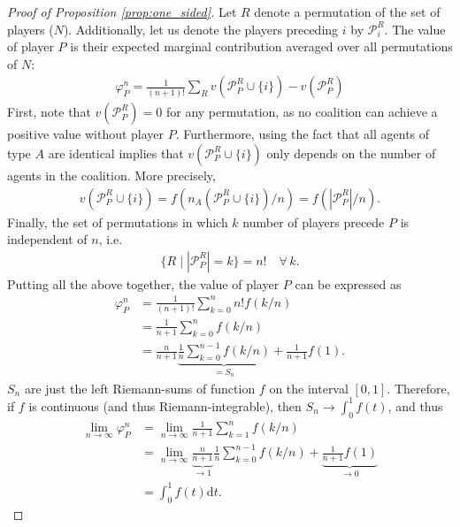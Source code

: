 \documentclass[a4paper]{article}
\newcommand{\dt}{\mathrm{d}t}
\begin{document}
\begin{proof}[Proof of Proposition \ref{prop:one_sided}]
    Let $R$ denote a permutation of the set of players ($N$).
    Additionally, let us denote the players preceding $i$ by $\mathcal{P}_i^R$.
    The value of player $P$ is their expected marginal contribution averaged over all permutations of $N$:
    \begin{align*}
        \varphi_P^n = \frac{1}{(n+1)!} \sum_R v(\mathcal{P}_P^R \cup \{i\}) - v(\mathcal{P}_P^R)
    \end{align*}
    First, note that $v(\mathcal{P}_P^R) = 0$ for any permutation, as no coalition can achieve a positive value without player $P$.
    Furthermore, using the fact that all agents of type $A$ are identical implies that $v(\mathcal{P}_P^R \cup \{i\})$ only depends on the number of agents in the coalition.
    More precisely, 
    \begin{align*}
        v(\mathcal{P}_P^R \cup \{i\}) = f(n_A(\mathcal{P}_P^R \cup \{i\}) / n) = f(|\mathcal{P}_P^R| / n).
    \end{align*}
    Finally, the set of permutations in which $k$ number of players precede $P$ is independent of $n$, i.e.
    \begin{align*}
        \{R \mid |\mathcal{P}_P^R| = k\} = n! \quad \forall\, k.
    \end{align*}
    Putting all the above together, the value of player $P$ can be expressed as
    \begin{align*}
        \varphi_P^n &= \frac{1}{(n+1)!} \sum_{k=0}^n n! f(k / n) \\
        &= \frac{1}{n+1} \sum_{k=0}^n f(k / n) \\
        &= \frac{n}{n+1} \underbrace{\frac{1}{n} \sum_{k=0}^{n-1} f(k / n)}_{=S_n} + \frac{1}{n+1} f(1).
    \end{align*}
    $S_n$ are just the left Riemann-sums of function $f$ on the interval $[0, 1]$.
    Therefore, if $f$ is continuous (and thus Riemann-integrable), then $S_n \to \int_0^1 f(t)$, and thus
    \begin{align*}
        \lim_{n \to \infty} \varphi_P^n &= \lim_{n \to \infty} \frac{1}{n+1} \sum_{k=1}^n f(k / n) \\
        &= \lim_{n \to \infty}\underbrace{\frac{n}{n+1}}_{\to 1} \frac{1}{n} \sum_{k=0}^{n-1} f(k / n) + \underbrace{\frac{1}{n+1} f(1)}_{\to 0} \\
        &= \int_0^1 f(t) \dt .
    \end{align*}
\end{proof}
\end{document}
